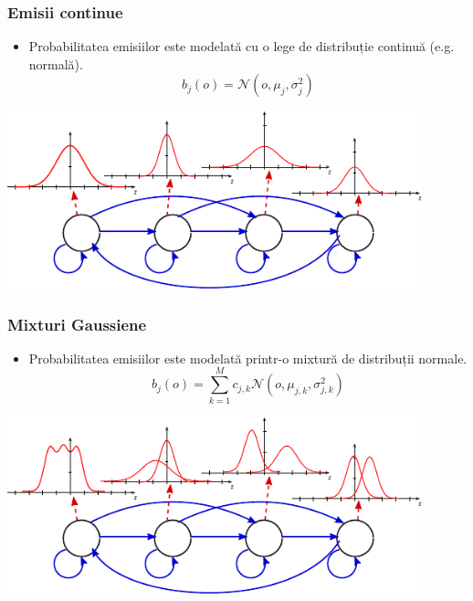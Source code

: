 \begin{frame}
  \frametitle{Emisii continue}
  \begin{itemize}
  \item Probabilitatea emisiilor este modelată cu o lege de distribuție continuă (e.g. normală).
    \begin{equation}
      \label{eq:contin1}
      b_j(o) = \mathcal{N}(o,\mu_j,\sigma_{j}^{2})
    \end{equation}
  \end{itemize}
  \vspace*{1em}
  \begin{center}
    \includegraphics[width=0.9\textwidth]{graphics/other-hmm/continuous.pdf}
  \end{center}
\end{frame}

\begin{frame}
  \frametitle{Mixturi Gaussiene}
  \begin{itemize}
  \item Probabilitatea emisiilor este modelată printr-o mixtură de distribuții normale.
    \begin{equation}
      \label{eq:contin2}
      b_j(o) = \displaystyle\sum_{k=1}^{M} c_{j,k}\mathcal{N}(o,\mu_{j,k},\sigma_{j,k}^2)
    \end{equation}
  \end{itemize}
  \vspace*{1em}
  \begin{center}
    \includegraphics[width=0.9\textwidth]{graphics/other-hmm/mixture.pdf}
  \end{center}
\end{frame}

